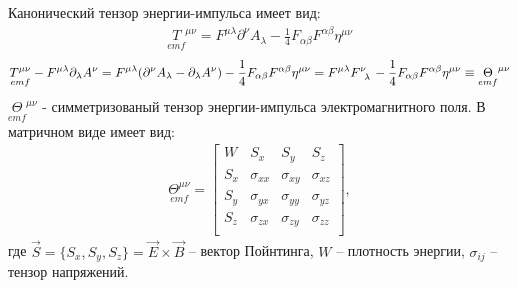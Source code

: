 \documentclass[__main__.tex]{subfiles}
\begin{document}
Канонический тензор энергии-импульса имеет вид:
\begin{gather*}
    \underset{emf}{T}^{\mu\nu} = F^{\mu\lambda}\partial^\nu A_\lambda - \frac{1}{4}F_{\alpha\beta}F^{\alpha\beta}\eta^{\mu\nu}
\end{gather*}
\begin{gather*}
    \underset{emf}{T^{\mu\nu}}
    -
    F^{\mu\lambda}\partial_\lambda A^\nu
    =
    F^{\mu\lambda}(\partial^\nu A_\lambda
    -
    \partial_\lambda A^\nu)
    -
    \frac{1}{4}F_{\alpha\beta}F^{\alpha\beta}\eta^{\mu\nu}
    =
    F^{\mu\lambda}F\indices{^\nu_\lambda}
    -
    \frac{1}{4}F_{\alpha\beta}F^{\alpha\beta}\eta^{\mu\nu}
    \equiv
    \underset{emf}{\Theta}^{\mu\nu}
\end{gather*}
$\underset{emf}{\Theta}^{\mu\nu}$ - симметризованый тензор энергии-импульса электромагнитного поля. В матричном виде имеет вид:
\begin{gather*}
    \underset{emf}{\Theta^{\mu\nu}} =
    \left[
        \begin{array}{cccc}
            W   & S_x         & S_y         & S_z         \\
            S_x & \sigma_{xx} & \sigma_{xy} & \sigma_{xz} \\
            S_y & \sigma_{yx} & \sigma_{yy} & \sigma_{yz} \\
            S_z & \sigma_{zx} & \sigma_{zy} & \sigma_{zz} \\
        \end{array}
        \right],
\end{gather*}
где $\vec{S}=\{S_x,S_y,S_z\}=\vec{E}\times\vec{B}$ -- вектор Пойнтинга, $W$ -- плотность энергии, $\sigma_{ij}$ -- тензор напряжений.
\end{document}
